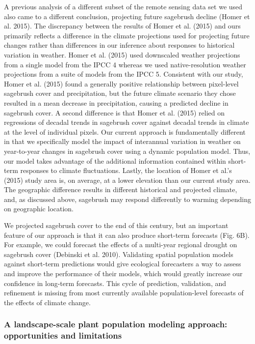 \documentclass[12pt,]{article}
\begin{document}
A previous analysis of a different subset of the remote sensing data set
we used also came to a different conclusion, projecting future sagebrush
decline (Homer et al. 2015). The discrepancy between the results of
Homer et al. (2015) and ours primarily reflects a difference in the
climate projections used for projecting future changes rather than
differences in our inference about responses to historical variation in
weather. Homer et al. (2015) used downscaled weather projections from a
single model from the IPCC 4 whereas we used native-resolution weather
projections from a suite of models from the IPCC 5. Consistent with our
study, Homer et al. (2015) found a generally positive relationship
between pixel-level sagebrush cover and precipitation, but the future
climate scenario they chose resulted in a mean decrease in
precipitation, causing a predicted decline in sagebrush cover. A second
difference is that Homer et al. (2015) relied on regressions of decadal
trends in sagebrush cover against decadal trends in climate at the level
of individual pixels. Our current approach is fundamentally different in
that we specifically model the impact of interannual variation in
weather on year-to-year changes in sagebrush cover using a dynamic
population model. Thus, our model takes advantage of the additional
information contained within short-term responses to climate
fluctuations. Lastly, the location of Homer et al.'s (2015) study area
is, on average, at a lower elevation than our current study area. The
geographic difference results in different historical and projected
climate, and, as discussed above, sagebrush may respond differently to
warming depending on geographic location.

We projected sagebrush cover to the end of this century, but an
important feature of our approach is that it can also produce short-term
forecasts (Fig. 6B). For example, we could forecast the effects of a
multi-year regional drought on sagebrush cover (Debinski et al. 2010).
Validating spatial population models against short-term predictions
would give ecological forecasters a way to assess and improve the
performance of their models, which would greatly increase our confidence
in long-term forecasts. This cycle of prediction, validation, and
refinement is missing from most currently available population-level
forecasts of the effects of climate change.

\subsubsection{A landscape-scale plant population modeling approach:
opportunities and
limitations}\label{a-landscape-scale-plant-population-modeling-approach-opportunities-and-limitations}
\end{document}
